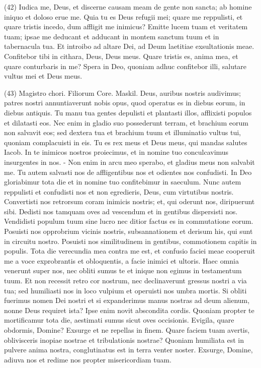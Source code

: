\begin{biblechapter}  (42) 
\verse Iudica me, Deus, et discerne causam meam de gente non sancta; ab homine iniquo et doloso erue me. 
\verse Quia tu es Deus refugii mei; quare me reppulisti, et quare tristis incedo, dum affligit me inimicus? 
\verse Emitte lucem tuam et veritatem tuam; ipsae me deducant et adducant in montem sanctum tuum et in tabernacula tua. 
\verse Et introibo ad altare Dei, ad Deum laetitiae exsultationis meae. Confitebor tibi in cithara, Deus, Deus meus. 
\verse Quare tristis es, anima mea, et quare conturbaris in me? Spera in Deo, quoniam adhuc confitebor illi, salutare vultus mei et Deus meus. 
\end{biblechapter}

\begin{biblechapter}  (43) 
\verse  Magistro chori. Filiorum Core. Maskil. 
\verse Deus, auribus nostris audivimus; patres nostri annuntiaverunt nobis opus, quod operatus es in diebus eorum, in diebus antiquis. 
\verse Tu manu tua gentes depulisti et plantasti illos, afflixisti populos et dilatasti eos. 
\verse Nec enim in gladio suo possederunt terram, et brachium eorum non salvavit eos; sed dextera tua et brachium tuum et illuminatio vultus tui, quoniam complacuisti in eis. 
\verse Tu es rex meus et Deus meus, qui mandas salutes Iacob. 
\verse In te inimicos nostros proiecimus, et in nomine tuo conculcavimus insurgentes in nos. - 
\verse Non enim in arcu meo sperabo, et gladius meus non salvabit me. 
\verse Tu autem salvasti nos de affligentibus nos et odientes nos confudisti. 
\verse In Deo gloriabimur tota die et in nomine tuo confitebimur in saeculum. 
\verse Nunc autem reppulisti et confudisti nos et non egredieris, Deus, cum virtutibus nostris. 
\verse Convertisti nos retrorsum coram inimicis nostris; et, qui oderunt nos, diripuerunt sibi. 
\verse Dedisti nos tamquam oves ad vescendum et in gentibus dispersisti nos. 
\verse Vendidisti populum tuum sine lucro nec ditior factus es in commutatione eorum. 
\verse Posuisti nos opprobrium vicinis nostris, subsannationem et derisum his, qui sunt in circuitu nostro. 
\verse Posuisti nos similitudinem in gentibus, commotionem capitis in populis. 
\verse Tota die verecundia mea contra me est, et confusio faciei meae cooperuit me 
\verse a voce exprobrantis et obloquentis, a facie inimici et ultoris. 
\verse Haec omnia venerunt super nos, nec obliti sumus te et inique non egimus in testamentum tuum. 
\verse Et non recessit retro cor nostrum, nec declinaverunt gressus nostri a via tua; 
\verse sed humiliasti nos in loco vulpium et operuisti nos umbra mortis. 
\verse Si obliti fuerimus nomen Dei nostri et si expanderimus manus nostras ad deum alienum, 
\verse nonne Deus requiret ista? Ipse enim novit abscondita cordis. 
\verse Quoniam propter te mortificamur tota die, aestimati sumus sicut oves occisionis. 
\verse Evigila, quare obdormis, Domine? Exsurge et ne repellas in finem. 
\verse Quare faciem tuam avertis, oblivisceris inopiae nostrae et tribulationis nostrae? 
\verse Quoniam humiliata est in pulvere anima nostra, conglutinatus est in terra venter noster. Exsurge, Domine, adiuva nos et redime nos propter misericordiam tuam. 
\end{biblechapter}

